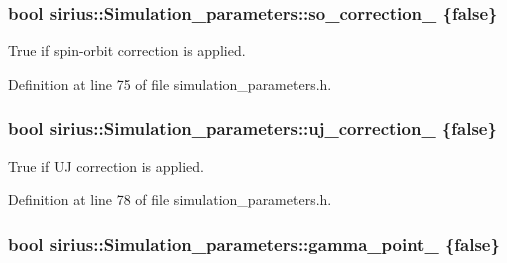 \subsubsection[{so\+\_\+correction\+\_\+}]{\setlength{\rightskip}{0pt plus 5cm}bool sirius\+::\+Simulation\+\_\+parameters\+::so\+\_\+correction\+\_\+ \{false\}\hspace{0.3cm}{\ttfamily [protected]}}\label{classsirius_1_1_simulation__parameters_a0ec6fb89078a406364190b00ebf0455a}


True if spin-\/orbit correction is applied. 



Definition at line 75 of file simulation\+\_\+parameters.\+h.

\hypertarget{classsirius_1_1_simulation__parameters_aad724bf05da461b881182259af50f791}{}
\subsubsection[{uj\+\_\+correction\+\_\+}]{\setlength{\rightskip}{0pt plus 5cm}bool sirius\+::\+Simulation\+\_\+parameters\+::uj\+\_\+correction\+\_\+ \{false\}\hspace{0.3cm}{\ttfamily [protected]}}\label{classsirius_1_1_simulation__parameters_aad724bf05da461b881182259af50f791}


True if U\+J correction is applied. 



Definition at line 78 of file simulation\+\_\+parameters.\+h.

\hypertarget{classsirius_1_1_simulation__parameters_aa834be8352acc1f928fabefa1006051f}{}
\subsubsection[{gamma\+\_\+point\+\_\+}]{\setlength{\rightskip}{0pt plus 5cm}bool sirius\+::\+Simulation\+\_\+parameters\+::gamma\+\_\+point\+\_\+ \{false\}\hspace{0.3cm}{\ttfamily [protected]}}\label{classsirius_1_1_simulation__parameters_aa834be8352acc1f928fabefa1006051f}


